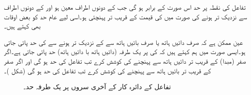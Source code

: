 تفاعل  کی نقطہ  پر حد اس  صورت  کے برابر ہو گی جب  کے دونوں اطراف  معین ہو اور  کے دونوں اطراف سے نزدیک تر ہونے کی صورت میں  کی قیمت  کے  قریب  تر پہنچتی ہو۔اسی لیے عام حد کو بعض اوقات  بھی کہتے ہیں۔

عین ممکن ہے کہ صرف دائیں ہاتھ یا صرف بائیں ہاتھ سے   کے نزدیک تر ہونے سے  کی حد پائی جاتی ہو۔ایسی صورت میں ہم کہتے ہیں کہ  کی  پر یک طرفہ (دائیں ہاتھ با دائیں ہاتھ)  حد پائی جاتی ہے۔اگر   صفر  (مبدا)  کے قریب تر    دائیں ہاتھ سے پہنچنے کی کوشش کرے تب تفاعل  کی حد  ہو گی  اور اگر  صفر   کے قریب تر   بائیں ہاتھ سے پہنچنے کی کوشش کرے تب تفاعل    کی حد  ہو گی (شکل )۔
\begin{figure}
\centering
\begin{minipage}{0.45\textwidth}
\centering
{}
\caption{مبدا پر دائیں ہاتھ حد اور بائیں ہاتھ حد مختلف ہیں۔}
\label{شکل_حد_دایاں_بایاں_مختلف}
\end{minipage}\hfill
\begin{minipage}{0.45\textwidth}
\centering
{}
\caption{تفاعل کے دائرہ کار کے آخری سروں پر یک طرفہ حد۔}
\label{شکل_حد_دایاں_بایاں_مختلف_نصف_دائرہ}
\end{minipage}%
\end{figure}

